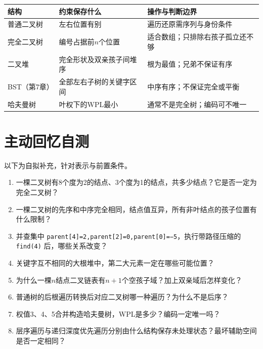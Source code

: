 \begin{wideblock}

\par\medskip\noindent\begin{minipage}{\linewidth}\fontsize{9.3}{12}\selectfont\begin{tabularx}{\linewidth}{@{}YYY@{}}
\toprule\noalign{}
结构 & 约束保存什么 & 操作与判断边界 \\
\midrule\noalign{}


普通二叉树 & 左右位置有别 & 遍历还原需序列与身份条件 \\
完全二叉树 & 编号占据前\(n\)个位置 & 适合数组；只排除右孩子孤立还不够 \\
二叉堆 & 完全形状及双亲孩子间堆序 & 根为最值；兄弟不保证有序 \\
BST（第7章） & 全部左右子树的关键字区间 & 中序有序；不保证完全或平衡 \\
哈夫曼树 & 叶权下的WPL最小 & 通常不是完全树；编码可不唯一 \\
\bottomrule\end{tabularx}
\end{minipage}\par\medskip

\end{wideblock}

\section{主动回忆自测}\label{DS05-check}

以下为自拟补充，针对表示与前置条件。

\begin{enumerate}
\def\labelenumi{\arabic{enumi}.}
\item
  一棵二叉树有8个度为2的结点、3个度为1的结点，共多少结点？它是否一定为完全二叉树？
\item
  一棵二叉树的先序和中序完全相同，结点值互异，所有非叶结点的孩子位置有什么限制？
\item
  并查集中 \texttt{parent[4]=\allowbreak{}2,\allowbreak{}parent[2]=\allowbreak{}0,\allowbreak{}parent[0]=\allowbreak{}−5}，执行带路径压缩的 \texttt{find(\allowbreak{}4)\allowbreak{}} 后，哪些关系改变？
\item
  关键字互不相同的大根堆中，第二大元素一定在哪些可能位置？
\item
  为什么一棵\(n\)结点二叉链表有\(n+1\)个空孩子域？加上双亲域后怎样变化？
\item
  普通树的后根遍历转换后对应二叉树哪一种遍历？为什么不是后序？
\item
  权值3、4、5合并构造哈夫曼树，WPL是多少？编码一定唯一吗？
\item
  层序遍历与递归深度优先遍历分别由什么结构保存未处理状态？最坏辅助空间是否一定相同？
\end{enumerate}

